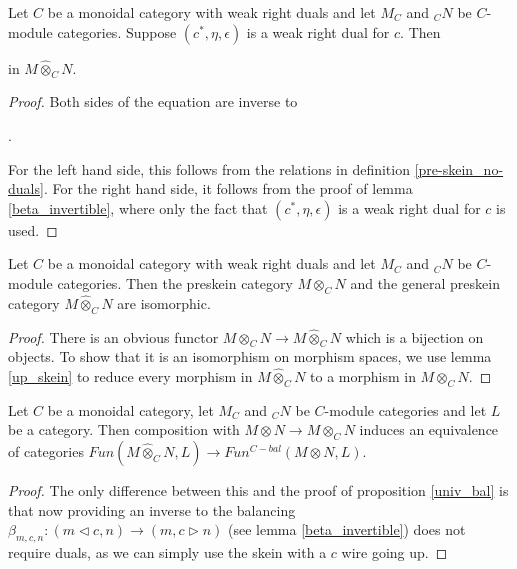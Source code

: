 \begin{lemma}\label{up_skein}
  
  \noindent Let $C$ be a monoidal category with weak right duals and let $M_C$
  and $_{C}N$ be $C$-module categories. Suppose $(c^*,\eta,\epsilon)$ is a
  weak right dual for $c$.
  Then \begin{center}\end{center} in
  $M \hat{\otimes}_C N$.
\end{lemma}

\begin{proof}
  Both sides of the equation are inverse
  to \begin{center}.\end{center} For the left hand
  side, this follows from the relations in definition
  \ref{pre-skein_no-duals}. For the right hand side, it follows from the proof
  of lemma \ref{beta_invertible}, where only the fact that
  $(c^*,\eta,\epsilon)$ is a weak right dual for $c$ is used.
\end{proof}

\begin{lemma} \label{lemma/equivalence-of-two-preskein-cats}
  
  \noindent Let $C$ be a monoidal category with weak right duals and let $M_C$
  and $_{C}N$ be $C$-module categories. Then the preskein category $M
  \otimes_C N$ and the general preskein category $M \hat{\otimes}_C N$ are
  isomorphic.
\end{lemma}

\begin{proof}
  There is an obvious functor $M \otimes_C N \to M \hat{\otimes}_C N$ which is a
  bijection on objects. To show that it is an isomorphism on morphism spaces,
  we use lemma \ref{up_skein} to reduce every morphism in $M \hat{\otimes}_C N$ to a
  morphism in $M\otimes_C N$.
\end{proof}

\begin{proposition}

  \noindent Let $C$ be a monoidal category, let $M_C$ and $_{C}N$ be
  $C$-module categories and let $L$ be a category. Then composition with
  $M \otimes N \to M \otimes_C N$ induces an equivalence of categories
  $Fun(M \hat{\otimes}_C N,L) \to Fun^{C-bal}(M \otimes N,L)$.
\end{proposition}

\begin{proof}
  The only difference between this and the proof of proposition \ref{univ_bal}
  is that now providing an inverse to the balancing $\beta_{m,c,n}:(m\lhd c,
  n)\to (m,c\rhd n)$ (see lemma \ref{beta_invertible}) does not require duals,
  as we can simply use the skein with a $c$ wire going up.
\end{proof}
  
